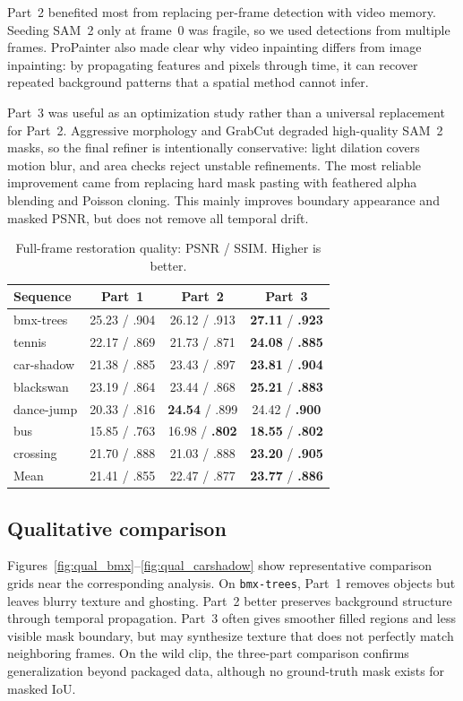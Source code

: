 \documentclass[10pt,twocolumn,letterpaper]{article}
\begin{document}
Part~2 benefited most from replacing per-frame detection with video memory. Seeding SAM~2 only at frame~0 was fragile, so we used detections from multiple frames. ProPainter also made clear why video inpainting differs from image inpainting: by propagating features and pixels through time, it can recover repeated background patterns that a spatial method cannot infer.

Part~3 was useful as an optimization study rather than a universal replacement for Part~2. Aggressive morphology and GrabCut degraded high-quality SAM~2 masks, so the final refiner is intentionally conservative: light dilation covers motion blur, and area checks reject unstable refinements. The most reliable improvement came from replacing hard mask pasting with feathered alpha blending and Poisson cloning. This mainly improves boundary appearance and masked PSNR, but does not remove all temporal drift.

\begin{table}[t]
  \centering
  \scriptsize
  \caption{Full-frame restoration quality: PSNR / SSIM. Higher is better.}
  \label{tab:full}
  \begin{tabular}{lccc}
    \toprule
    Sequence & Part~1 & Part~2 & Part~3 \\
    \midrule
    bmx-trees & 25.23 / .904 & 26.12 / .913 & \textbf{27.11} / \textbf{.923} \\
    tennis & 22.17 / .869 & 21.73 / .871 & \textbf{24.08} / \textbf{.885} \\
    car-shadow & 21.38 / .885 & 23.43 / .897 & \textbf{23.81} / \textbf{.904} \\
    blackswan & 23.19 / .864 & 23.44 / .868 & \textbf{25.21} / \textbf{.883} \\
    dance-jump & 20.33 / .816 & \textbf{24.54} / .899 & 24.42 / \textbf{.900} \\
    bus & 15.85 / .763 & 16.98 / \textbf{.802} & \textbf{18.55} / \textbf{.802} \\
    crossing & 21.70 / .888 & 21.03 / .888 & \textbf{23.20} / \textbf{.905} \\
    \midrule
    Mean & 21.41 / .855 & 22.47 / .877 & \textbf{23.77} / \textbf{.886} \\
    \bottomrule
  \end{tabular}
\end{table}

\subsection{Qualitative comparison}
Figures~\ref{fig:qual_bmx}--\ref{fig:qual_carshadow} show representative comparison grids near the corresponding analysis. On \texttt{bmx-trees}, Part~1 removes objects but leaves blurry texture and ghosting. Part~2 better preserves background structure through temporal propagation. Part~3 often gives smoother filled regions and less visible mask boundary, but may synthesize texture that does not perfectly match neighboring frames. On the wild clip, the three-part comparison confirms generalization beyond packaged data, although no ground-truth mask exists for masked IoU.
\end{document}
